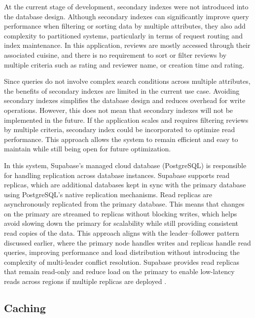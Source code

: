 At the current stage of development, secondary indexes were not introduced into the database design.
Although secondary indexes can significantly improve query performance when filtering or sorting data by multiple attributes,
they also add complexity to partitioned systems, particularly in terms of request routing and index maintenance.
In this application, reviews are mostly accessed through their associated cuisine, and there is no requirement to sort or
filter reviews by multiple criteria such as rating and reviewer name, or creation time and rating.

Since queries do not involve complex search conditions across multiple attributes, the benefits of secondary
indexes are limited in the current use case. Avoiding secondary indexes simplifies the database design and reduces overhead for write operations.
However, this does not mean that secondary indexes will not be implemented in the future. If the application scales and requires
filtering reviews by multiple criteria, secondary index could be incorporated to optimize read performance. This approach allows the system to remain efficient 
and easy to maintain while still being open for future optimization.

In this system, Supabase’s managed cloud database (PostgreSQL) is responsible for handling replication across database instances.
Supabase supports read replicas, which are additional databases kept in sync with the primary database using PostgreSQL’s
native replication mechanisms. Read replicas are asynchronously replicated from the primary database.
This means that changes on the primary are streamed to replicas without blocking writes, which helps avoid slowing down the primary
for scalability while still providing consistent read copies of the data. This approach aligns with the leader–follower pattern discussed earlier,
where the primary node handles writes and replicas handle read queries, improving performance and load distribution without introducing the complexity
of multi-leader conflict resolution. Supabase provides read replicas that remain read-only and reduce load on the primary to enable low-latency reads across regions
if multiple replicas are deployed \cite{Supabase_2026}.



\subsection{Caching}


